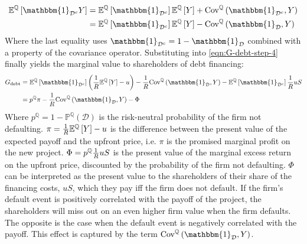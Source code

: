 \documentclass[../main.tex]{subfiles}
\begin{document}
            \begin{align}
                \mathbb{E}^{\mathbb{Q}}\left[
                    \mathbbm{1}_{\mathcal{D}^{c}}Y
                \right]
                &=
                \mathbb{E}^{\mathbb{Q}}\left[\mathbbm{1}_{\mathcal{D}^{c}}\right] 
                \mathbb{E}^{\mathbb{Q}}\left[Y\right] 
                + 
                \text{Cov}^{\mathbb{Q}}\left(\mathbbm{1}_{\mathcal{D}^{c}}, Y\right) 
                \nonumber\\
                &=
                \mathbb{E}^{\mathbb{Q}}\left[\mathbbm{1}_{\mathcal{D}^{c}}\right] 
                \mathbb{E}^{\mathbb{Q}}\left[Y\right] 
                - 
                \text{Cov}^{\mathbb{Q}}\left(\mathbbm{1}_{\mathcal{D}}, Y\right) 
            \end{align}
        Where the last equality uses $\mathbbm{1}_{\mathcal{D}^{c}} = 1 - \mathbbm{1}_{\mathcal{D}}$ 
        combined with a property of the covariance operator.
        Substituting into \cref{eqn:G-debt-step-4} finally yields the marginal value to shareholders of debt financing:
            \begin{align}
                G_{\text{debt}} &=
                \mathbb{E}^{\mathbb{Q}}\left[\mathbbm{1}_{\mathcal{D}^{c}}\right] 
                \left(
                    \discountfactor
                    \mathbb{E}^{\mathbb{Q}}\left[Y\right] 
                    - u
                \right)
                -
                \discountfactor
                \text{Cov}^{\mathbb{Q}}\left(\mathbbm{1}_{\mathcal{D}}, Y\right) 
                - 
                \mathbb{E}^{\mathbb{Q}}\left[
                    \mathbbm{1}_{\mathcal{D}^{c}}
                \right] \discountfactor u S
                \nonumber \\
                &= 
                p^{\mathbb{Q}} \pi 
                - \discountfactor 
                \text{Cov}^{\mathbb{Q}}\left(
                    \mathbbm{1}_{\mathcal{D}}, 
                    Y
                \right) 
                - \Phi
                \label{eqn:marginal-shareholder-value-debt-financing}
            \end{align}
        Where $p^{\mathbb{Q}} = 1 - \mathbb{P}^{\mathbb{Q}}\left(\mathcal{D}\right)$ 
        is the risk-neutral probability of the firm not defaulting. 
        $\pi = \frac{1}{R} \mathbb{E}^{\mathbb{Q}}\left[Y\right] - u$ 
        is the difference between the present value of the expected payoff and the upfront price, 
        i.e. $\pi$ is the promised marginal profit on the new project. 
        $\Phi = p^{\mathbb{Q}} \frac{1}{R} u S$
        is the present value of the marginal excess return on the upfront price, 
        discounted by the probability of the firm not defaulting.
        $\Phi$ can be interpreted as the present value to the shareholders of their share of the financing costs, $uS$,
        which they pay iff the firm does not default. 
        If the firm's default event is positively correlated with the payoff of the project,
        the shareholders will miss out on an even higher firm value when the firm defaults.
        The opposite is the case when the default event is negatively correlated with the payoff.
        This effect is captured by the term 
        $\text{Cov}^{\mathbb{Q}}\left(\mathbbm{1}_{\mathcal{D}}, Y\right)$.
\end{document}
